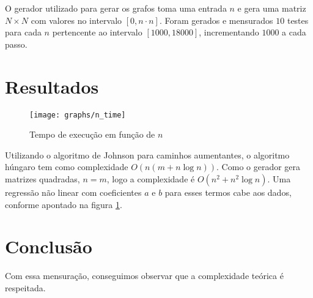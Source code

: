 \documentclass[11pt]{article}
\begin{document}
O gerador utilizado para gerar os grafos toma uma entrada $n$ e gera uma matriz $N \times N$ com valores no intervalo $[0, n \cdot n]$.
Foram gerados e mensurados $10$ testes para cada $n$ pertencente ao intervalo $[1000, 18000]$, incrementando $1000$ a cada passo.

\section{Resultados}

\begin{figure}[H]
    \centering
    \caption{Tempo de execução em função de $n$}
    \label{fig:n_time}
    \texttt{[image: graphs/n\_time]}
\end{figure}

Utilizando o algoritmo de Johnson para caminhos aumentantes, o algoritmo húngaro tem como complexidade $O(n(m+n \log n))$.
Como o gerador gera matrizes quadradas, $n = m$, logo a complexidade é $O(n^2 + n^2 \log n)$.
Uma regressão não linear com coeficientes $a$ e $b$ para esses termos cabe aos dados, conforme apontado na figura \ref{fig:n_time}.

\section{Conclusão}

Com essa mensuração, conseguimos observar que a complexidade teórica é respeitada.
\end{document}

